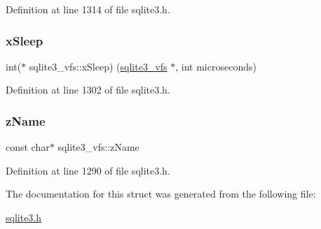 Definition at line 1314 of file sqlite3.\+h.

\mbox{\label{structsqlite3__vfs_abd36ce64a27bd6c1b57a6f2c7031ff65}} 
\subsubsection{\texorpdfstring{x\+Sleep}{xSleep}}
{\footnotesize\ttfamily int($\ast$ sqlite3\+\_\+vfs\+::x\+Sleep) (\mbox{\hyperlink{structsqlite3__vfs}{sqlite3\+\_\+vfs}} $\ast$, int microseconds)}



Definition at line 1302 of file sqlite3.\+h.

\mbox{\label{structsqlite3__vfs_a0f06a27ac2201ea04c0623ef19e5d73e}} 
\subsubsection{\texorpdfstring{z\+Name}{zName}}
{\footnotesize\ttfamily const char$\ast$ sqlite3\+\_\+vfs\+::z\+Name}



Definition at line 1290 of file sqlite3.\+h.



The documentation for this struct was generated from the following file\+:\begin{DoxyCompactItemize}
\item 
\mbox{\hyperlink{sqlite3_8h}{sqlite3.\+h}}\end{DoxyCompactItemize}
